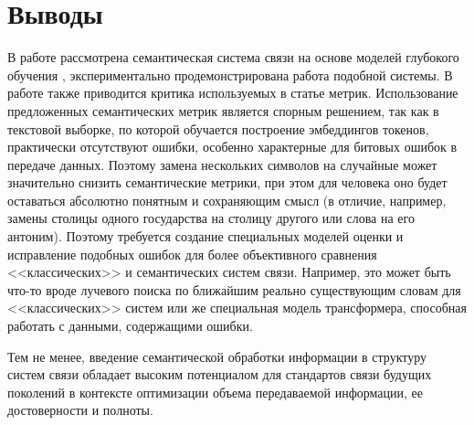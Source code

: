 \documentclass[a4paper,12pt]{article}
\begin{document}
 	
	\section*{Выводы}
	В работе рассмотрена семантическая система связи на основе моделей глубокого обучения \cite{xie2021sem}, экспериментально продемонстрирована работа подобной системы. В работе также приводится критика используемых в статье метрик. Использование предложенных семантических метрик является спорным решением, так как в текстовой выборке, по которой обучается построение эмбеддингов токенов, практически отсутствуют ошибки, особенно характерные для битовых ошибок в передаче данных. Поэтому замена нескольких символов на случайные может значительно снизить семантические метрики, при этом для человека оно будет оставаться абсолютно понятным и сохраняющим смысл (в отличие, например, замены столицы одного государства на столицу другого или слова на его антоним). Поэтому требуется создание специальных моделей оценки и исправление подобных ошибок для более объективного сравнения <<классических>> и семантических систем связи. Например, это может быть что-то вроде лучевого поиска по ближайшим реально существующим словам для <<классических>> систем или же специальная модель трансформера, способная работать с данными, содержащими ошибки. 
	
	Тем не менее, введение семантической обработки информации в структуру систем связи обладает высоким потенциалом для стандартов связи будущих поколений в контексте оптимизации объема передаваемой информации, ее достоверности и полноты.
\end{document}
